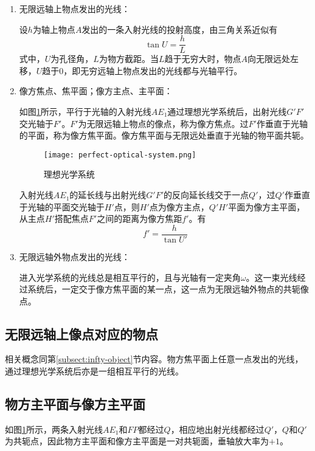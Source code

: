 \documentclass[cn,11pt]{elegantbook}
\begin{document}
\begin{enumerate}	
	\item 无限远轴上物点发出的光线：
	
	设$h$为轴上物点$A$发出的一条入射光线的投射高度，由三角关系近似有
	\begin{equation}
		\tan U=\frac{h}{L}
	\end{equation}
	式中，$U$为孔径角，$L$为物方截距。当$L$趋于无穷大时，物点$A$向无限远处左移，$U$趋于$0$，即无穷远轴上物点发出的光线都与光轴平行。
	\item 像方焦点、焦平面；像方主点、主平面：
	
	如图\ref{fig:perfect-optical-system}所示，平行于光轴的入射光线$AE_1$通过理想光学系统后，出射光线$G'F'$交光轴于$F'$。$F'$为无限远轴上物点的像点，称为像方焦点。过$F'$作垂直于光轴的平面，称为像方焦平面。像方焦平面与无限远处垂直于光轴的物平面共轭。
	
	\begin{figure}[htbp]
		\centering
		\texttt{[image: perfect-optical-system.png]}
		\caption{理想光学系统}
		\label{fig:perfect-optical-system}
	\end{figure}
	
	入射光线$AE_1$的延长线与出射光线$G'F'$的反向延长线交于一点$Q'$，过$Q'$作垂直于光轴的平面交光轴于$H'$点，则$H'$点为像方主点，$Q'H'$平面为像方主平面，从主点$H'$搭配焦点$F'$之间的距离为像方焦距$f'$。有
	\begin{equation}
		f'=\frac{h}{\tan U'}
	\end{equation}
	
	\item 无限远轴外物点发出的光线：
	
	进入光学系统的光线总是相互平行的，且与光轴有一定夹角$\omega$。这一束光线经过系统后，一定交于像方焦平面的某一点，这一点为无限远轴外物点的共轭像点。	
\end{enumerate}

\subsection{无限远轴上像点对应的物点}
相关概念同第\ref{subsect:infty-object}节内容。物方焦平面上任意一点发出的光线，通过理想光学系统后亦是一组相互平行的光线。
\subsection{物方主平面与像方主平面}
\label{subsect:base-point}
如图\ref{fig:perfect-optical-system}所示，两条入射光线$AE_1$和$FP$都经过$Q$，相应地出射光线都经过$Q'$，$Q$和$Q'$为共轭点，因此物方主平面和像方主平面是一对共轭面，垂轴放大率为$+1$。
\end{document}
